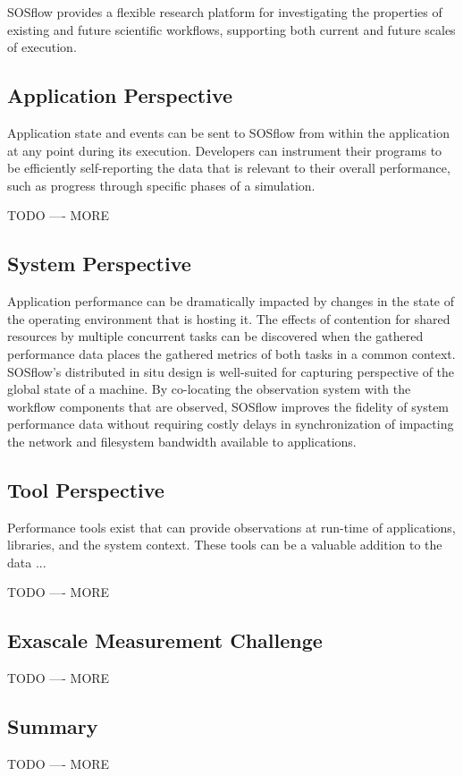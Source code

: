 %
\par
%
%
SOSflow provides a flexible research platform for investigating the
properties of existing and future scientific workflows, supporting
both current and future scales of execution.
%
%
\subsection{Application Perspective} %
%
Application state and events can be sent to SOSflow from within the application
at any point during its execution.
%
Developers can instrument their programs to be efficiently self-reporting
the data that is relevant to their overall performance, such as progress
through specific phases of a simulation.
%
\par
%
TODO ---- MORE
%
\subsection{System Perspective} %
%
Application performance can be dramatically impacted by changes in the
state of the operating environment that is hosting it.
%
The effects of contention for shared resources by multiple concurrent
tasks can be discovered when the gathered performance data places the
gathered metrics of both tasks in a common context.
%
SOSflow's distributed in situ design is well-suited for capturing
perspective of the global state of a machine.
%
By co-locating the observation system with the workflow components
that are observed, SOSflow improves the fidelity of system performance
data without requiring costly delays in synchronization of impacting
the network and filesystem bandwidth available to applications.
%
\subsection{Tool Perspective} %
%
Performance tools exist that can provide observations at run-time
of applications, libraries, and the system context.
%
These tools can be a valuable addition to the data ...
%
\par
%
TODO ---- MORE
%
\subsection{Exascale Measurement Challenge} %
%
TODO ---- MORE
%
\subsection{Summary} %
%
TODO ---- MORE
%


